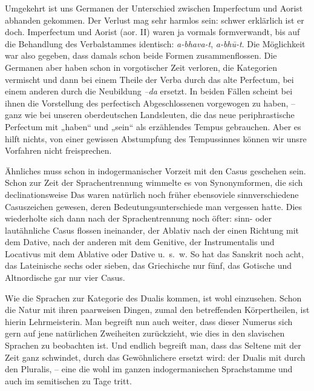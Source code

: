{Umgekehrt ist uns Germanen der Unterschied zwischen Imperfectum und Aorist abhanden gekommen. Der Verlust mag sehr harmlos sein: schwer erklärlich ist er doch. Imperfectum und Aorist (aor. II) waren ja vormals formverwandt, bis auf die Behandlung des Verbalstammes identisch: \textit{a-bhava-t}, \textit{a-bhū-t}. Die Möglichkeit war also gegeben, dass \label{fp.248} damals schon beide Formen zusammenflossen. Die Germanen aber haben  schon in vorgotischer Zeit verloren, die Kategorien vermischt und dann bei einem Theile der Verba durch das alte Perfectum, bei einem anderen durch die Neubildung  \textit{–da} ersetzt. In beiden Fällen scheint bei ihnen die Vorstellung des perfectisch Abgeschlossenen vorgewogen zu haben, – ganz wie bei unseren oberdeutschen Landsleuten, die das neue periphrastische Perfectum mit „haben“ und „sein“ als erzählendes Tempus gebrauchen. Aber es hilft nichts, von einer gewissen Abstumpfung des Tempussinnes können wir unsre Vorfahren nicht freisprechen.

Ähnliches muss schon in indogermanischer Vorzeit mit den Casus geschehen sein. Schon zur Zeit der Sprachentrennung wimmelte es von Synonymformen, die sich declinationsweise  Das waren natürlich noch früher ebensoviele sinnverschiedene Casuszeichen gewesen, deren Bedeutungsunterschiede man vergessen hatte. Dies wiederholte sich dann nach der Sprachentrennung noch öfter: sinn- oder lautähnliche Casus flossen ineinander, der Ablativ nach der einen Richtung mit dem Dative, nach der anderen mit dem Genitive, der Instrumentalis und Locativus mit dem Ablative oder Dative u.~s.~w. So hat \label{sp.254} das Sanskrit noch acht, das Lateinische  sechs oder sieben, das Griechische nur fünf, das Gotische und Altnordische gar nur vier Casus.

Wie die Sprachen zur Kategorie des Dualis kommen, ist wohl einzusehen. Schon die Natur mit ihren paarweisen Dingen, zumal den betreffenden Körpertheilen, ist hierin Lehrmeisterin. Man begreift nun auch weiter, dass dieser Numerus sich gern auf jene natürlichen Zweiheiten zurückzieht, wie dies in den slavischen Sprachen zu beobachten ist. Und endlich begreift man, dass das Seltene mit der Zeit ganz schwindet, durch das Gewöhnlichere ersetzt wird: der Dualis mit durch den Pluralis, – eine  die wohl im ganzen indogermanischen Sprachstamme und auch im semitischen zu Tage tritt.

}
